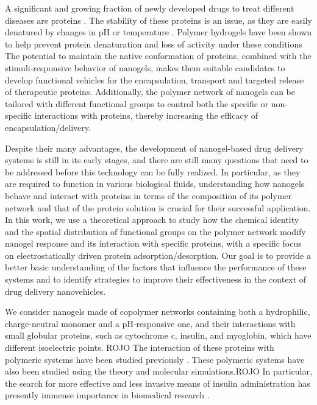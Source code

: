 A significant and growing fraction of newly developed drugs to treat different diseases are proteins \addcite.
The stability of these proteins is an issue, as they are easily denatured by changes in pH or temperature \addcite.
Polymer hydrogels have been shown to help prevent protein denaturation and loss of activity under these conditions \addcite
The potential to maintain the native conformation of proteins, combined with the stimuli-responsive behavior of nanogels, makes them suitable candidates to develop functional vehicles for the encapsulation, transport and targeted release of therapeutic proteins.
Additionally, the polymer network of nanogels can be tailored with different functional groups to control both the specific or non-specific  interactions with proteins, thereby increasing the efficacy of encapsulation/delivery.


Despite their many advantages, the development of nanogel-based drug delivery systems is still in its early stages, and there are still many questions that need to be addressed before this technology can be fully realized.
In particular, as they are required to function in various biological fluids, understanding how nanogels behave and interact with proteins in terms of the composition of its polymer network and that of the  protein solution is crucial for their successful application.
In this work, we use a theoretical approach to study how the chemical identity and the spatial distribution of functional groups on the polymer network modify nanogel response and its interaction with specific proteins, with a specific focus on electrostatically driven protein adsorption/desorption.
Our goal is to provide a better basic understanding of the factors that influence the performance of these systems and to identify strategies to improve their effectiveness in the context of drug delivery nanovehicles.






We consider nanogels made of copolymer networks containing both a hydrophilic, charge-neutral monomer and a pH-responsive one, and their interactions with small globular proteins, such as cytochrome c, insulin, and myoglobin, which have different isoelectric points.
ROJO
The interaction of these proteins with polymeric systems have been studied previously .
These polymeric systems have also been studied using the theory and molecular simulations.
ROJO
In particular, the search for more effective and less invasive means of insulin administration has presently immense importance in biomedical research .




